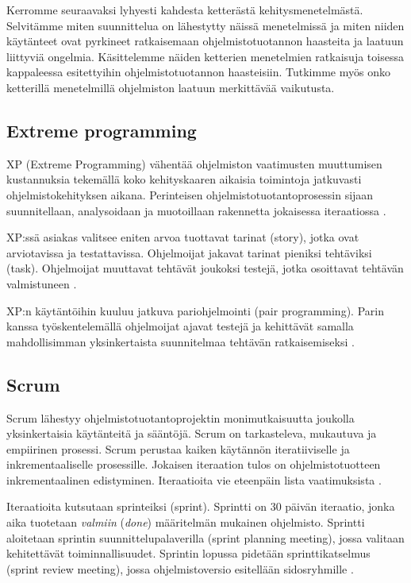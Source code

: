 \documentclass[finnish]{tktltiki2}
\theoremstyle{definition}
\theoremstyle{remark}
\begin{document}
Kerromme seuraavaksi lyhyesti kahdesta ketterästä kehitysmenetelmästä. Selvitämme miten suunnittelua on lähestytty näissä menetelmissä ja miten niiden käytänteet ovat pyrkineet ratkaisemaan ohjelmistotuotannon haasteita ja laatuun liittyviä ongelmia. Käsittelemme näiden ketterien menetelmien ratkaisuja toisessa kappaleessa esitettyihin ohjelmistotuotannon haasteisiin. Tutkimme myös onko ketterillä menetelmillä ohjelmiston laatuun merkittävää vaikutusta.

\subsection{Extreme programming}

XP (Extreme Programming) vähentää ohjelmiston vaatimusten muuttumisen kustannuksia tekemällä koko kehityskaaren aikaisia toimintoja jatkuvasti ohjelmistokehityksen aikana. Perinteisen ohjelmistotuotantoprosessin sijaan suunnitellaan, analysoidaan ja muotoillaan rakennetta jokaisessa iteraatiossa \cite{BEC99}.

XP:ssä asiakas valitsee eniten arvoa tuottavat tarinat (story), jotka ovat arviotavissa ja testattavissa. Ohjelmoijat jakavat tarinat pieniksi tehtäviksi (task). Ohjelmoijat muuttavat tehtävät joukoksi testejä, jotka osoittavat tehtävän valmistuneen \cite{BEC99}. 

XP:n käytäntöihin kuuluu jatkuva pariohjelmointi (pair programming). Parin kanssa työskentelemällä ohjelmoijat ajavat testejä ja kehittävät samalla mahdollisimman yksinkertaista suunnitelmaa tehtävän ratkaisemiseksi \cite{BEC99}.  

\subsection{Scrum}

Scrum lähestyy ohjelmistotuotantoprojektin monimutkaisuutta joukolla yksinkertaisia käytänteitä ja sääntöjä. Scrum on tarkasteleva, mukautuva ja empiirinen prosessi. Scrum perustaa kaiken käytännön iteratiiviselle ja inkrementaaliselle prosessille. Jokaisen iteraation tulos on ohjelmistotuotteen inkrementaalinen edistyminen. Iteraatioita vie eteenpäin lista vaatimuksista \cite{SCH09}.

Iteraatioita kutsutaan sprinteiksi (sprint). Sprintti on 30 päivän iteraatio, jonka aika tuotetaan \textit{valmiin} (\textit{done}) määritelmän mukainen ohjelmisto. Sprintti aloitetaan sprintin suunnittelupalaverilla (sprint planning meeting), jossa valitaan kehitettävät toiminnallisuudet. Sprintin lopussa pidetään sprinttikatselmus (sprint review meeting), jossa ohjelmistoversio esitellään sidosryhmille \cite{SCH09}.
\end{document}
